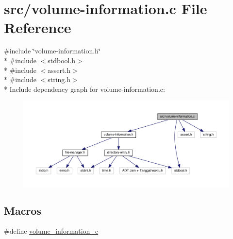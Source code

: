 \hypertarget{volume-information_8c}{\section{src/volume-\/information.c File Reference}
\label{volume-information_8c}
}
{\ttfamily \#include \char`\"{}volume-\/information.\-h\char`\"{}}\\*
{\ttfamily \#include $<$stdbool.\-h$>$}\\*
{\ttfamily \#include $<$assert.\-h$>$}\\*
{\ttfamily \#include $<$string.\-h$>$}\\*
Include dependency graph for volume-\/information.c\-:\nopagebreak
\begin{figure}[H]
\begin{center}
\leavevmode
\includegraphics[width=350pt]{volume-information_8c__incl}
\end{center}
\end{figure}
\subsection*{Macros}
\begin{DoxyCompactItemize}
\item 
\#define \hyperlink{volume-information_8c_aa2ebcd0c3a3beac7a43ef1b7be6be0b3}{volume\-\_\-information\-\_\-c}
\end{DoxyCompactItemize}
